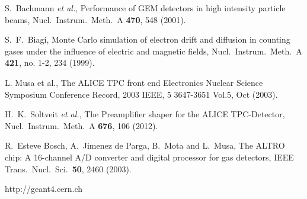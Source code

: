\documentclass[preprint,5p]{elsarticle}
\begin{document}
\begin{thebibliography}{99}
 S.~Bachmann {\it et al.},
 Performance of GEM detectors in high intensity particle beams,
 Nucl.\ Instrum.\ Meth.\ A {\bf 470}, 548 (2001).

   S.~F.~Biagi,
  Monte Carlo simulation of electron drift and diffusion in counting gases 
  under the influence of electric and magnetic fields,
  Nucl.\ Instrum.\ Meth.\ A {\bf 421}, no. 1-2, 234 (1999).

 L. Musa et al., The ALICE TPC front end Electronics Nuclear Science Symposium 
 Conference Record, 2003 IEEE, 5 3647-3651 Vol.5, Oct (2003).
 
   H.~K.~Soltveit {\it et al.},
  The Preamplifier shaper for the ALICE TPC-Detector,
  Nucl.\ Instrum.\ Meth.\ A {\bf 676}, 106 (2012).
 
   R.~Esteve Bosch, A.~Jimenez de Parga, B.~Mota and L.~Musa,
  The ALTRO chip: A 16-channel A/D converter and digital processor for gas 
  detectors,
  IEEE Trans.\ Nucl.\ Sci.\  {\bf 50}, 2460 (2003).

http://geant4.cern.ch
 	

\end{thebibliography}
\end{document}
